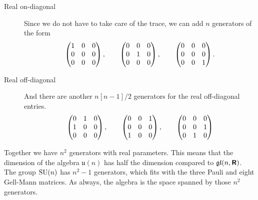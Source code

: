\documentclass[11pt, english, fleqn, DIV=15, headinclude, BCOR=1cm]{scrartcl}
\begin{document}
\begin{description}
    \item[Real on-diagonal]
        Since we do not have to take care of the trace, we can add $n$
        generators of the form
        \[
            \begin{pmatrix}
                1 & 0 & 0 \\
                0 & 0 & 0 \\
                0 & 0 & 0
            \end{pmatrix}
            ,\qquad
            \begin{pmatrix}
                0 & 0 & 0 \\
                0 & 1 & 0 \\
                0 & 0 & 0
            \end{pmatrix}
            ,\qquad
            \begin{pmatrix}
                0 & 0 & 0 \\
                0 & 0 & 0 \\
                0 & 0 & 1
            \end{pmatrix}
            .
        \]

    \item[Real off-diagonal]
        And there are another $n[n-1]/2$ generators for the real off-diagonal
        entries.
        \[
            \begin{pmatrix}
                0 & 1 & 0 \\
                1 & 0 & 0 \\
                0 & 0 & 0
            \end{pmatrix}
            ,\qquad
            \begin{pmatrix}
                0 & 0 & 1 \\
                0 & 0 & 0 \\
                1 & 0 & 0
            \end{pmatrix}
            ,\qquad
            \begin{pmatrix}
                0 & 0 & 0 \\
                0 & 0 & 1 \\
                0 & 1 & 0
            \end{pmatrix}
        \]
\end{description}

Together we have $n^2$ generators with real parameters. This means that the
dimension of the algebra $\mathfrak u(n)$ has half the dimension compared to
$\mathfrak{gl}(n, \text{\bfseries\sffamily R})$. The group $\mathrm{SU}(n)$ has $n^2 - 1$ generators, which fits with the
three Pauli and eight Gell-Mann matrices. As always, the algebra is the space
spanned by those $n^2$ generators.
\end{document}
